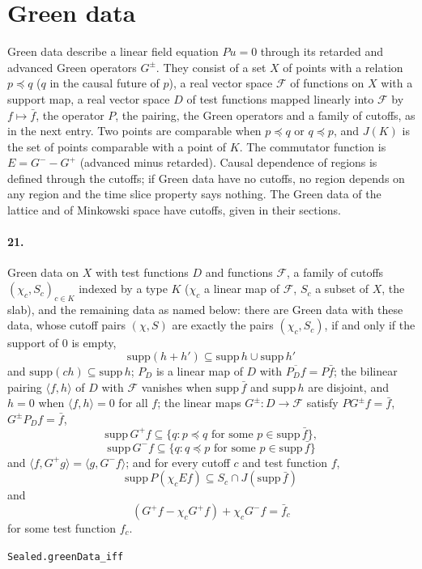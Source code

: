 \documentclass[11pt]{article}
\begin{document}
\section*{Green data}
Green data describe a linear field equation $P u = 0$ through its retarded and advanced Green operators $G^\pm$. They consist of a set $X$ of points with a relation $p \preceq q$ ($q$ in the causal future of $p$), a real vector space $\mathcal F$ of functions on $X$ with a support map, a real vector space $D$ of test functions mapped linearly into $\mathcal F$ by $f \mapsto \bar f$, the operator $P$, the pairing, the Green operators and a family of cutoffs, as in the next entry. Two points are comparable when $p \preceq q$ or $q \preceq p$, and $J(K)$ is the set of points comparable with a point of $K$. The commutator function is $E = G^- - G^+$ (advanced minus retarded). Causal dependence of regions is defined through the cutoffs; if Green data have no cutoffs, no region depends on any region and the time slice property says nothing. The Green data of the lattice and of Minkowski space have cutoffs, given in their sections.

\paragraph{21.} Green data on $X$ with test functions $D$ and functions $\mathcal F$, a family of cutoffs $(\chi_c, S_c)_{c \in K}$ indexed by a type $K$ ($\chi_c$ a linear map of $\mathcal F$, $S_c$ a subset of $X$, the slab), and the remaining data as named below: there are Green data with these data, whose cutoff pairs $(\chi, S)$ are exactly the pairs $(\chi_c, S_c)$, if and only if the support of $0$ is empty, \[\mathrm{supp}(h + h') \subseteq \mathrm{supp}\, h \cup \mathrm{supp}\, h'\] and $\mathrm{supp}(c h) \subseteq \mathrm{supp}\, h$; $P_D$ is a linear map of $D$ with $\overline{P_D f} = P \bar f$; the bilinear pairing $\langle f, h \rangle$ of $D$ with $\mathcal F$ vanishes when $\mathrm{supp}\, \bar f$ and $\mathrm{supp}\, h$ are disjoint, and $h = 0$ when $\langle f, h \rangle = 0$ for all $f$; the linear maps $G^\pm : D \to \mathcal F$ satisfy $P G^\pm f = \bar f$, $G^\pm P_D f = \bar f$, \[\mathrm{supp}\, G^+ f \subseteq \{q : p \preceq q \text{ for some } p \in \mathrm{supp}\, \bar f\},\] \[\mathrm{supp}\, G^- f \subseteq \{q : q \preceq p \text{ for some } p \in \mathrm{supp}\, \bar f\}\] and $\langle f, G^+ g \rangle = \langle g, G^- f \rangle$; and for every cutoff $c$ and test function $f$, \[\mathrm{supp}\, P(\chi_c E f) \subseteq S_c \cap J(\mathrm{supp}\, \bar f)\] and \[(G^+ f - \chi_c G^+ f) + \chi_c G^- f = \bar f_c\] for some test function $f_c$.\par{\footnotesize\texttt{Sealed.greenData\_iff}}
\end{document}
